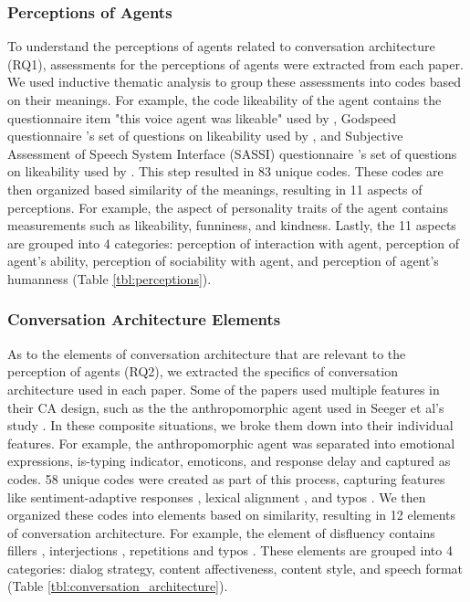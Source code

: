 \subsubsection*{Perceptions of Agents} To understand the perceptions of agents related to conversation architecture (RQ1), assessments for the perceptions of agents were extracted from each paper. We used inductive thematic analysis to group these assessments into codes based on their meanings. For example, the code likeability of the agent contains the questionnaire item "this voice agent was likeable" used by \cite{cuadra2021my}\cmt{[67]}, Godspeed questionnaire \cite{bartneck2009measurement}'s set of questions on likeability used by \cite{linnemann2018can}\cmt{[15]}, and Subjective Assessment of Speech System Interface (SASSI) questionnaire \cite{hone2000towards}'s set of questions on likeability used by \cite{chan2021kinvoices}\cmt{[74]}\cite{choi2020nobody}\cmt{[54]}. This step resulted in 83 unique codes. These codes are then organized based similarity of the meanings, resulting in 11 aspects of perceptions. For example, the aspect of personality traits of the agent contains measurements such as likeability, funniness, and kindness. Lastly, the 11 aspects are grouped into 4 categories: perception of interaction with agent, perception of agent's ability, perception of sociability with agent, and perception of agent's humanness (Table \ref{tbl:perceptions}).

\subsubsection*{Conversation Architecture Elements}
As to the elements of conversation architecture that are relevant to the perception of agents (RQ2), we extracted the specifics of conversation architecture used in each paper. Some of the papers used multiple features in their CA design, such as the the anthropomorphic agent used in Seeger et al's study \cite{seeger2021chatbots}\cmt{[35]}. In these composite situations, we broke them down into their individual features. For example, the anthropomorphic agent \cite{seeger2021chatbots}\cmt{[35]} was separated into emotional expressions, is-typing indicator, emoticons, and response delay and captured as codes. 58 unique codes were created as part of this process, capturing features like sentiment-adaptive responses \cite{diederich2019emulating}\cmt{[25]}, lexical alignment \cite{spillner2021talk}\cmt{[18]}, and typos \cite{westerman2019believe}\cmt{[9]}. We then organized these codes into elements based on similarity, resulting in 12 elements of conversation architecture. For example, the element of disfluency contains fillers \cite{jeong2019exploring}\cmt{[10]}\cite{wester2015artificial}\cmt{[14]}, interjections \cite{ceha2022expressive}\cmt{[77]}\cite{hu2021enhancing}\cmt{[56]}, repetitions \cite{yang2021effect}\cmt{[72]} and typos \cite{westerman2019believe}\cmt{[9]}. These elements are grouped into 4 categories: dialog strategy, content affectiveness, content style, and speech format (Table \ref{tbl:conversation_architecture}).

